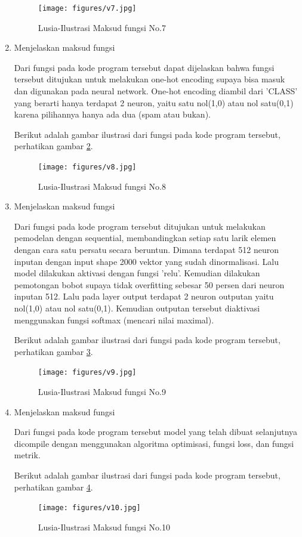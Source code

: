 \begin{enumerate}
		\begin{figure}[!hbtp]
		\centering
		\texttt{[image: figures/v7.jpg]}
		\caption{Lusia-Ilustrasi Maksud fungsi No.7}
		\label{7A7}
		\end{figure}
	
\item Menjelaskan maksud fungsi
	
		
	\par Dari fungsi pada kode program tersebut dapat dijelaskan bahwa fungsi tersebut ditujukan untuk melakukan one-hot encoding supaya bisa masuk dan digunakan pada neural network. One-hot encoding diambil dari 'CLASS' yang berarti hanya terdapat 2 neuron, yaitu satu nol(1,0) atau nol satu(0,1) karena pilihannya hanya ada dua (spam atau bukan).
	\par Berikut adalah gambar ilustrasi dari fungsi pada kode program tersebut, perhatikan gambar \ref{7A8}.
		\begin{figure}[!hbtp]
		\centering
		\texttt{[image: figures/v8.jpg]}
		\caption{Lusia-Ilustrasi Maksud fungsi No.8}
		\label{7A8}
		\end{figure}

\item Menjelaskan maksud fungsi
	
	\par Dari fungsi pada kode program tersebut ditujukan untuk melakukan pemodelan dengan sequential, membandingkan setiap satu larik elemen dengan cara satu persatu secara beruntun. Dimana terdapat 512 neuron inputan dengan input shape 2000 vektor yang sudah dinormalisasi. Lalu model dilakukan aktivasi dengan fungsi 'relu'. Kemudian dilakukan pemotongan bobot supaya tidak overfitting sebesar 50 persen dari neuron inputan 512. Lalu pada layer output terdapat 2 neuron outputan yaitu nol(1,0) atau nol satu(0,1). Kemudian outputan tersebut diaktivasi menggunakan fungsi softmax (mencari nilai maximal).
	\par Berikut adalah gambar ilustrasi dari fungsi pada kode program tersebut, perhatikan gambar \ref{7A9}.
		\begin{figure}[!hbtp]
		\centering
		\texttt{[image: figures/v9.jpg]}
		\caption{Lusia-Ilustrasi Maksud fungsi No.9}
		\label{7A9}
		\end{figure}
		
\item Menjelaskan maksud fungsi
	
	\par Dari fungsi pada kode program tersebut model yang telah dibuat selanjutnya dicompile dengan menggunakan algoritma optimisasi, fungsi loss, dan fungsi metrik.
	\par Berikut adalah gambar ilustrasi dari fungsi pada kode program tersebut, perhatikan gambar \ref{7A10}.
		\begin{figure}[!hbtp]
		\centering
		\texttt{[image: figures/v10.jpg]}
		\caption{Lusia-Ilustrasi Maksud fungsi No.10}
		\label{7A10}
		\end{figure}


\end{enumerate}
